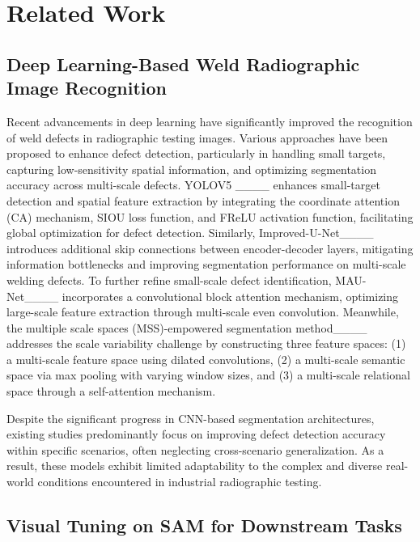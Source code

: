\section{Related Work}
\label{sec2}


\subsection{Deep Learning-Based Weld Radiographic Image Recognition}  
\label{subsec2.1}
Recent advancements in deep learning have significantly improved the recognition of weld defects in radiographic testing images. Various approaches have been proposed to enhance defect detection, particularly in handling small targets, capturing low-sensitivity spatial information, and optimizing segmentation accuracy across multi-scale defects.
YOLOV5 ____ enhances small-target detection and spatial feature extraction by integrating the coordinate attention (CA) mechanism, SIOU loss function, and FReLU activation function, facilitating global optimization for defect detection. Similarly, Improved-U-Net____ introduces additional skip connections between encoder-decoder layers, mitigating information bottlenecks and improving segmentation performance on multi-scale welding defects. 
To further refine small-scale defect identification, MAU-Net____ incorporates a convolutional block attention mechanism, optimizing large-scale feature extraction through multi-scale even convolution. Meanwhile, the multiple scale spaces (MSS)-empowered segmentation method____ addresses the scale variability challenge by constructing three feature spaces: (1) a multi-scale feature space using dilated convolutions, (2) a multi-scale semantic space via max pooling with varying window sizes, and (3) a multi-scale relational space through a self-attention mechanism. 

Despite the significant progress in CNN-based segmentation architectures, existing studies predominantly focus on improving defect detection accuracy within specific scenarios, often neglecting cross-scenario generalization. As a result, these models exhibit limited adaptability to the complex and diverse real-world conditions encountered in industrial radiographic testing.

\subsection{Visual Tuning on SAM for Downstream Tasks}  
\label{subsec2.2}

